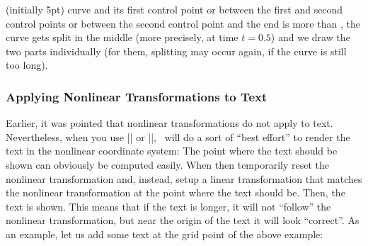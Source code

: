 \begin{enumerate}
\begin{command}{\pgfsettransformnonlinearflatness{} (initially 5pt)}
            curve and its first control point or between the first and second
            control points or between the second control point and the end is
            more than , the curve gets split in the middle (more
            precisely, at time $t= 0.5$) and we draw the two parts individually
            (for them, splitting may occur again, if the curve is still too
            long).
\begin{codeexample}[preamble={\usepgfmodule{nonlineartransformations}}]
\end{codeexample}
        \end{command}
\end{enumerate}


\subsubsection{Applying Nonlinear Transformations to Text}

Earlier, it was pointed that nonlinear transformations do not apply to text.
Nevertheless, when you use |\pgftext| or |\pgfnode|, \pgfname\ will do a sort
of ``best effort'' to render the text in the nonlinear coordinate system: The
point where the text should be shown can obviously be computed easily. When
then temporarily reset the nonlinear transformation and, instead, setup a
linear transformation that matches the nonlinear transformation at the point
where the text should be. Then, the text is shown. This means that if the text
is longer, it will not ``follow'' the nonlinear transformation, but near the
origin of the text it will look ``correct''. As an example, let us add some
text at the grid point of the above example:
%
\begin{codeexample}[preamble={\usepgfmodule{nonlineartransformations}}]
\end{codeexample}


